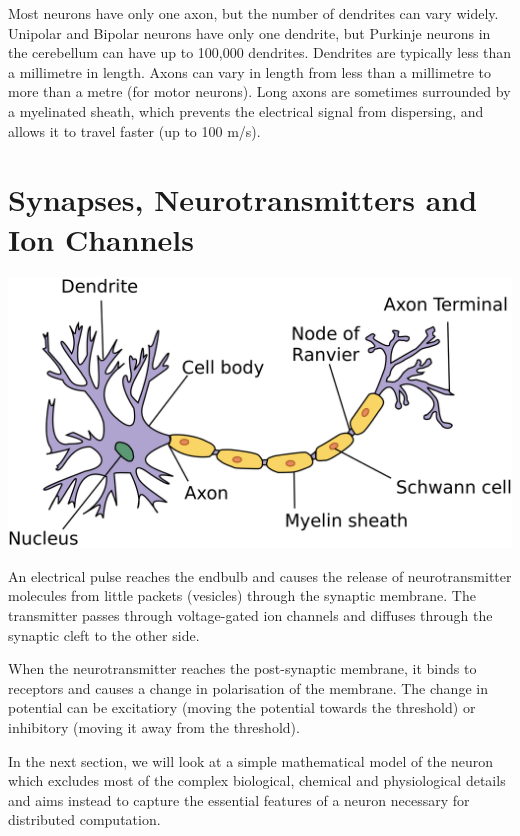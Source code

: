 \documentclass[11pt]{article}
\begin{document}
Most neurons have only one axon, but the number of dendrites can vary widely.
Unipolar and Bipolar neurons have only one dendrite, but Purkinje neurons in the cerebellum can have up to 100,000 dendrites.
Dendrites are typically less than a millimetre in length.
Axons can vary in length from less than a millimetre to more than a metre (for motor neurons).
Long axons are sometimes surrounded by a myelinated sheath, which prevents the electrical signal from dispersing, and allows it to travel faster (up to 100 m/s).

\section{Synapses, Neurotransmitters and Ion Channels}\label{sec:synapses-neurotransmitters-and-ion-channels}
\includegraphics[width=\textwidth,height=\textheight,keepaspectratio]{images/img_8}

An electrical pulse reaches the endbulb and causes the release of neurotransmitter molecules from little packets (vesicles) through the synaptic membrane.
The transmitter passes through voltage-gated ion channels and diffuses through the synaptic cleft to the other side.

When the neurotransmitter reaches the post-synaptic membrane, it binds to receptors and causes a change in polarisation of the membrane.
The change in potential can be excitatiory (moving the potential towards the threshold) or inhibitory (moving it away from the threshold).

In the next section, we will look at a simple mathematical model of the neuron which excludes most of the complex biological, chemical and physiological details and aims instead to capture the essential features of a neuron necessary for distributed computation.

\pagebreak
\end{document}
